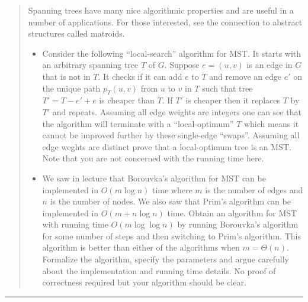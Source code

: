 \documentclass[11pt]{article}
\begin{document}



\begin{quote}
Spanning trees have many nice algorithmic properties and are useful
  in a number of applications. For those interested, see the connection
  to abstract structures called matroids.
  \begin{itemize}
  \item Consider the following ``local-search'' algorithm for MST.  It
    starts with an arbitrary spanning tree $T$ of $G$. Suppose
    $e=(u,v)$ is an edge in $G$ that is not in $T$. It checks if it
    can add $e$ to $T$ and remove an edge $e'$ on the unique path
    $p_T(u,v)$ from $u$ to $v$ in $T$ such that tree $T' = T - e' + e$
    is cheaper than $T$.  If $T'$ is cheaper then it replaces $T$ by
    $T'$ and repeats. Assuming all edge weights are integers one can
    see that the algorithm will terminate with a ``local-optimum'' $T$
    which means it cannot be improved further by these single-edge
    ``swaps''.  Assuming all edge weghts are distinct prove that a
    local-optimum tree is an MST. Note that you are not concerned with
    the running time here.
  \item We saw in lecture that Borouvka's algorithm for MST can be
  implemented in $O(m \log n)$ time where $m$ is the number of edges
  and $n$ is the number of nodes. We also saw that Prim's algorithm
  can be implemented in $O(m + n \log n)$ time.
  Obtain an algorithm
    for MST with running time $O(m \log \log n)$ by running Borouvka's
    algorithm for some number of steps and then switching to Prim's
    algorithm. This algorithm is better than either of the algorithms
    when $m = \Theta(n)$. Formalize the algorithm, specify the
    parameters and argue carefully about the implementation and running
    time details. No proof of correctness required but your algorithm should be
    clear.
  \end{itemize}
\end{quote}
\hrule
\end{document}
